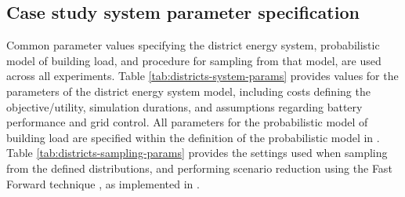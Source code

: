 \clearpage
\begin{subappendices}

    \section{Case study system parameter specification} \label{app:districts-case-study-params}

    Common parameter values specifying the district energy system, probabilistic model of building load, and procedure for sampling from that model, are used across all experiments. Table \ref{tab:districts-system-params} provides values for the parameters of the district energy system model, including costs defining the objective/utility, simulation durations, and assumptions regarding battery performance and grid control. All parameters for the probabilistic model of building load are specified within the definition of the probabilistic model in . Table \ref{tab:districts-sampling-params} provides the settings used when sampling from the defined distributions, and performing scenario reduction using the Fast Forward technique \citep{heitsch2003ScenarioReductionAlgorithms}, as implemented in \citep{gioia2023ScenarioReducer}.\\


\end{subappendices}

